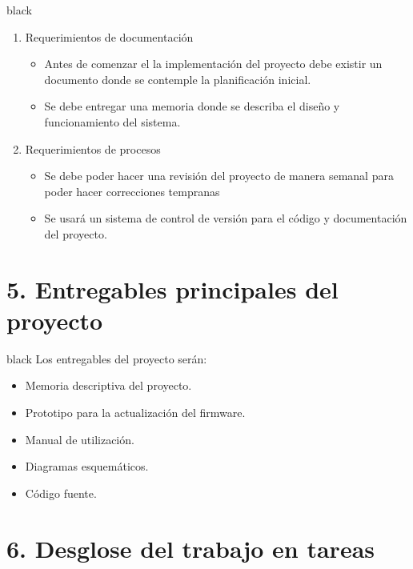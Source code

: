 \documentclass[11pt]{charter}
\begin{document}
\begin{consigna}{black}
\begin{enumerate}
\begin{enumerate}
\begin{enumerate}
	\end{enumerate}
	\item Requerimientos de documentación
	\begin{itemize}
		\item Antes de comenzar el la implementación del proyecto debe existir un documento donde se contemple la planificación inicial.
		\item Se debe entregar una memoria donde se describa el diseño y funcionamiento del sistema.
	\end{itemize}
    \item Requerimientos de procesos
    \begin{itemize}
    	\item Se debe poder hacer una revisión del proyecto de manera semanal para poder hacer correcciones tempranas
    	\item Se usará un sistema de control de versión para el código y documentación del proyecto.
    \end{itemize}
	\end{enumerate}
\end{enumerate}

\end{consigna}

\section{5. Entregables principales del proyecto}
\label{sec:entregables}

\begin{consigna}{black}
Los entregables del proyecto serán:
\begin{itemize}
\item Memoria descriptiva del proyecto.
\item Prototipo para la actualización del firmware.
\item Manual de utilización.
\item Diagramas esquemáticos.
\item Código fuente.

\end{itemize}

\end{consigna}

\section{6. Desglose del trabajo en tareas}
\label{sec:wbs}
\end{document}
